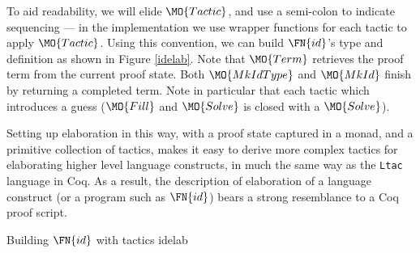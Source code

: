 To aid readability, we will elide $\MO{Tactic}$, and use a semi-colon to indicate
sequencing --- in the implementation we use wrapper functions for each tactic to
apply $\MO{Tactic}$.
Using this convention, we can build $\FN{id}$'s type and definition as shown
in Figure \ref{idelab}. Note that $\MO{Term}$ retrieves the proof term from the current proof
state. Both $\MO{MkIdType}$ and $\MO{MkId}$ finish by returning a completed \TT{} term.
Note in particular that each tactic which introduces a guess ($\MO{Fill}$ 
and $\MO{Solve}$ is closed with a $\MO{Solve}$).

Setting up elaboration in this way, with a proof state captured in a monad,
and a primitive collection of tactics,
makes it easy to derive more complex tactics for elaborating higher level language constructs,
in much the same way as the \texttt{Ltac} language in Coq. As a result, the
description of elaboration of
a language construct (or a program such as $\FN{id}$) bears a strong resemblance to
a Coq proof script.

{Building $\FN{id}$ with tactics}
{idelab}


                             

